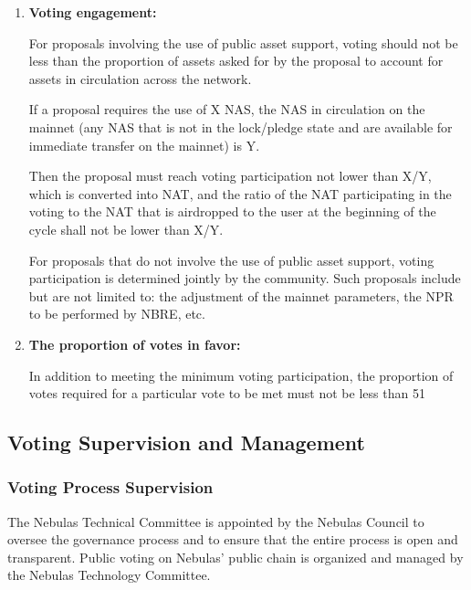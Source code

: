 \begin{enumerate}
	\item 

	\textbf{Voting engagement:}

	For proposals involving the use of public asset support, voting should not be less than the proportion of assets asked for by the proposal to account for assets in circulation across the network.

	If a proposal requires the use of X NAS, the NAS in circulation on the mainnet (any NAS that is not in the lock/pledge state and are available for immediate transfer on the mainnet) is Y.

	Then the proposal must reach voting participation not lower than X/Y, which is converted into NAT, and the ratio of the NAT participating in the voting to the NAT that is airdropped to the user at the beginning of the cycle shall not be lower than X/Y.

	For proposals that do not involve the use of public asset support, voting participation is determined jointly by the community. Such proposals include but are not limited to: the adjustment of the mainnet parameters, the NPR to be performed by NBRE, etc.

	\item

	\textbf{The proportion of votes in favor:}

	In addition to meeting the minimum voting participation, the proportion of votes required for a particular vote to be met must not be less than 51%
	
\end{enumerate}

\subsection{Voting Supervision and Management}

\subsubsection{Voting Process Supervision}
\label{Second-vote}

The Nebulas Technical Committee is appointed by the Nebulas Council to oversee the governance process and to ensure that the entire process is open and transparent. Public voting on Nebulas' public chain is organized and managed by the Nebulas Technology Committee.

